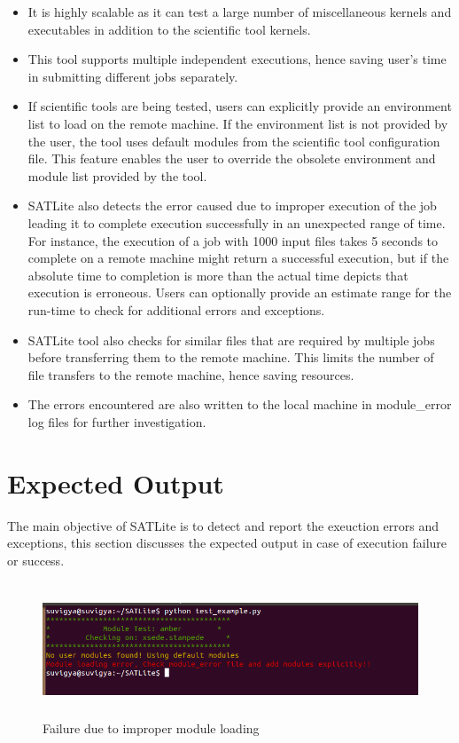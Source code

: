 \documentclass[10pt]{ruthesis}
\begin{document}
\begin{itemize}
\item It is highly scalable as it can test a large number of miscellaneous kernels and executables in addition to the scientific tool kernels.
\item This tool supports multiple independent executions, hence saving user's time in submitting different jobs separately.  
\item If scientific tools are being tested, users can explicitly provide an environment list to load on the remote machine. If the environment list is not provided by the user, the tool uses default modules from the scientific tool configuration file. This feature enables the user to override the obsolete environment and module list provided by the tool.
\item SATLite also detects the error caused due to improper execution of the job leading it to complete execution successfully in an unexpected range of time. For instance, the execution of a job with 1000 input files takes 5 seconds to complete on a remote machine might return a successful execution, but if the absolute time to completion is more than the actual time depicts that execution is erroneous. Users can optionally provide an estimate range for the run-time to check for additional errors and exceptions.
\item SATLite tool also checks for similar files that are required by multiple jobs before transferring them to the remote machine. This limits the number of file transfers to the remote machine, hence saving resources. 
\item The errors encountered are also written to the local machine in module\_error log files for further investigation.
\end{itemize}

\section{Expected Output}
The main objective of SATLite is to detect and report the exeuction errors and exceptions, this section discusses the expected output in case of execution failure or success.

\begin{figure}
  \begin{center}
  \includegraphics[width=16cm,height=4cm]{module_fail.png}
  \caption{Failure due to improper module loading}
  \label{fig:modfail}
  \end{center}
\end{figure}
\end{document}
